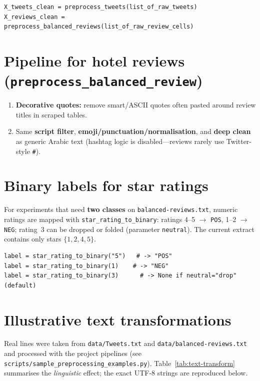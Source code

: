 \documentclass[11pt,a4paper]{report}
\begin{document}
\begin{lstlisting}[style=py, caption={Batch cleaning before vectorisation.}, label={lst:prep-batch}]
X_tweets_clean = preprocess_tweets(list_of_raw_tweets)
X_reviews_clean = preprocess_balanced_reviews(list_of_raw_review_cells)
\end{lstlisting}

\section{Pipeline for hotel reviews (\texttt{preprocess\_balanced\_review})}

\begin{enumerate}[noitemsep]
    \item \textbf{Decorative quotes:} remove smart/ASCII quotes often pasted around review titles in scraped tables.
    \item Same \textbf{script filter}, \textbf{emoji/punctuation/normalisation}, and \textbf{deep clean} as generic Arabic text (hashtag logic is disabled---reviews rarely use Twitter-style \texttt{\#}).
\end{enumerate}

\section{Binary labels for star ratings}

For experiments that need \textbf{two classes} on \texttt{balanced-reviews.txt}, numeric ratings are mapped with \texttt{star\_rating\_to\_binary}: ratings 4--5 $\rightarrow$ \texttt{POS}, 1--2 $\rightarrow$ \texttt{NEG}; rating~3 can be dropped or folded (parameter \texttt{neutral}). The current extract contains only stars $\{1,2,4,5\}$.

\begin{lstlisting}[style=py, caption={Binary mapping for the rating column (strings or ints).}, label={lst:prep-binary}]
label = star_rating_to_binary("5")   # -> "POS"
label = star_rating_to_binary(1)    # -> "NEG"
label = star_rating_to_binary(3)      # -> None if neutral="drop" (default)
\end{lstlisting}

\section{Illustrative text transformations}

Real lines were taken from \texttt{data/Tweets.txt} and \texttt{data/balanced-reviews.txt} and processed with the project pipelines (see \texttt{scripts/sample\_preprocessing\_examples.py}). Table~\ref{tab:text-transform} summarises the \emph{linguistic} effect; the exact UTF-8 strings are reproduced below.
\end{document}
